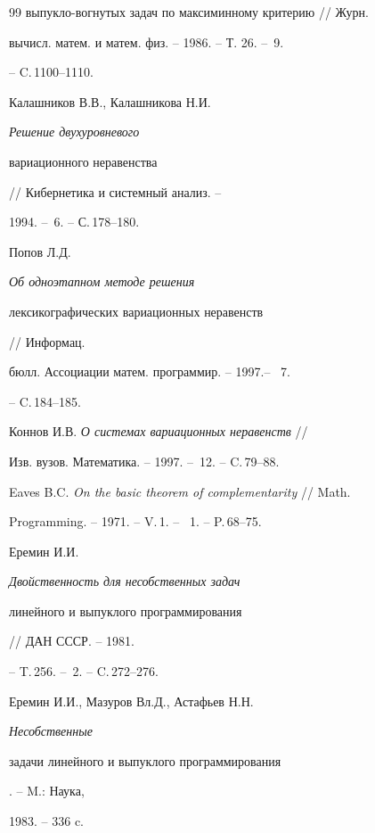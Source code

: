 \begin{thebibliography}{99}
{выпукло-вогнутых задач по максиминному критерию} // Журн.


вычисл. матем. и матем. физ. -- 1986. -- Т. 26. -- \No\,9.


-- C.\,1100--1110.




Калашников В.В., Калашникова Н.И. {\em Решение двухуровневого


вариационного неравенства} // Кибернетика и системный анализ. --


1994. -- \No\,6. -- С.\,178--180.




Попов Л.Д. {\em Об одноэтапном методе решения


лексикографических вариационных неравенств} // Информац.


бюлл. Ассоциации матем. программир. -- 1997.-- \No\, 7.


-- C.\,184--185.




Коннов И.В. {\em О системах вариационных неравенств} //


Изв. вузов. Математика. -- 1997. -- \No\,12. -- C.\,79--88.




Eaves B.C. {\em On the basic theorem of complementarity} // Math.


Programming. -- 1971. -- V.\,1. -- \No\, 1. -- P.\,68--75.




Еремин И.И. {\em Двойственность для несобственных задач


линейного и выпуклого программирования} // ДАН СССР. -- 1981.


-- T.\,256. -- \No\,2. -- C.\,272--276.




Еремин И.И., Мазуров Вл.Д., Астафьев Н.Н. {\em Несобственные


задачи линейного и выпуклого программирования}. -- M.: Наука,


1983. -- 336 c.





\end{thebibliography}





\vskip 2cm














\label{end}





